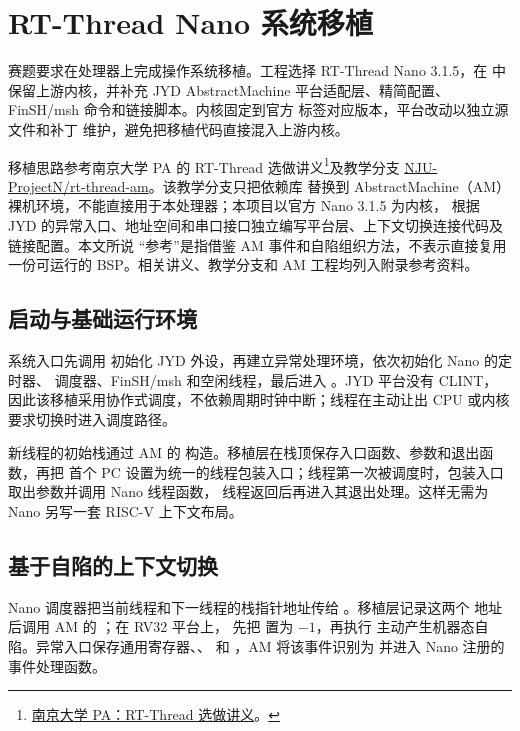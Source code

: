 \clearpage
\section{RT-Thread Nano 系统移植}\label{sec:system-port}

赛题要求在处理器上完成操作系统移植。工程选择 RT-Thread Nano 3.1.5，在
 中保留上游内核，并补充 JYD AbstractMachine 平台适配层、精简配置、
FinSH/msh 命令和链接脚本。内核固定到官方  标签对应版本，平台改动以独立源文件和补丁
维护，避免把移植代码直接混入上游内核。

移植思路参考南京大学 PA 的 RT-Thread 选做讲义\footnote{\href{https://ysyx.oscc.cc/docs/ics-pa/4.1.html\#rt-thread-\%E9\%80\%89\%E5\%81\%9A}{南京大学 PA：RT-Thread 选做讲义}。}及教学分支
\href{https://github.com/NJU-ProjectN/rt-thread-am}{NJU-ProjectN/rt-thread-am}。该教学分支只把依赖库
替换到 AbstractMachine（AM）裸机环境，不能直接用于本处理器；本项目以官方 Nano 3.1.5 为内核，
根据 JYD 的异常入口、地址空间和串口接口独立编写平台层、上下文切换连接代码及链接配置。本文所说
“参考”是指借鉴 AM 事件和自陷组织方法，不表示直接复用一份可运行的 BSP。相关讲义、教学分支和
AM 工程均列入附录参考资料。

\subsection{启动与基础运行环境}

系统入口先调用  初始化 JYD 外设，再建立异常处理环境，依次初始化 Nano 的定时器、
调度器、FinSH/msh 和空闲线程，最后进入 。JYD 平台没有 CLINT，
因此该移植采用协作式调度，不依赖周期时钟中断；线程在主动让出 CPU 或内核要求切换时进入调度路径。

新线程的初始栈通过 AM 的  构造。移植层在栈顶保存入口函数、参数和退出函数，再把
首个 PC 设置为统一的线程包装入口；线程第一次被调度时，包装入口取出参数并调用 Nano 线程函数，
线程返回后再进入其退出处理。这样无需为 Nano 另写一套 RISC-V 上下文布局。

\subsection{基于自陷的上下文切换}

Nano 调度器把当前线程和下一线程的栈指针地址传给 。移植层记录这两个
地址后调用 AM 的 ；在 RV32 平台上， 先把  置为 $-1$，再执行
 主动产生机器态自陷。异常入口保存通用寄存器、、 和
，AM 将该事件识别为  并进入 Nano 注册的事件处理函数。

